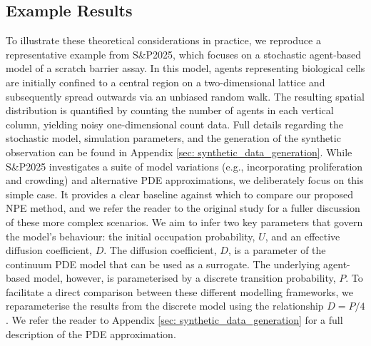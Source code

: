 \documentclass{article}
\begin{document}
\subsection{Example Results}\label{sec:example_classical_results}
To illustrate these theoretical considerations in practice, we reproduce a representative example from S\&P2025, which focuses on a stochastic agent-based model of a scratch barrier assay. In this model, agents representing biological cells are initially confined to a central region on a two-dimensional lattice and subsequently spread outwards via an unbiased random walk. The resulting spatial distribution is quantified by counting the number of agents in each vertical column, yielding noisy one-dimensional count data. Full details regarding the stochastic model, simulation parameters, and the generation of the synthetic observation can be found in Appendix \ref{sec: synthetic_data_generation}. While S\&P2025 investigates a suite of model variations (e.g., incorporating proliferation and crowding) and alternative PDE approximations, we deliberately focus on this simple case. It provides a clear baseline against which to compare our proposed NPE method, and we refer the reader to the original study for a fuller discussion of these more complex scenarios. We aim to infer two key parameters that govern the model's behaviour: the initial occupation probability, $U$, and an effective diffusion coefficient, $D$. The diffusion coefficient, $D$, is a parameter of the continuum PDE model that can be used as a surrogate. The underlying agent-based model, however, is parameterised by a discrete transition probability, $P$. To facilitate a direct comparison between these different modelling frameworks, we reparameterise the results from the discrete model using the relationship $D=P/4$. We refer the reader to Appendix \ref{sec: synthetic_data_generation} for a full description of the PDE approximation.
\end{document}
